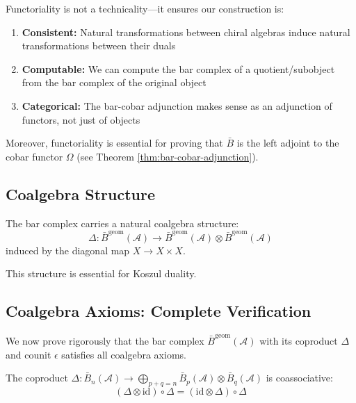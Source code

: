 \begin{remark}\label{rem:why-functoriality}
Functoriality is not a technicality—it ensures our construction is:
\begin{enumerate}
\item \textbf{Consistent:} Natural transformations between chiral algebras induce natural transformations between their duals
\item \textbf{Computable:} We can compute the bar complex of a quotient/subobject from the bar complex of the original object
\item \textbf{Categorical:} The bar-cobar adjunction makes sense as an adjunction of functors, not just of objects
\end{enumerate}

Moreover, functoriality is essential for proving that $\bar{B}$ is the left adjoint to the cobar functor $\Omega$ (see Theorem \ref{thm:bar-cobar-adjunction}).
\end{remark}

\subsection{Coalgebra Structure}

\begin{theorem}\label{thm:bar-coalgebra}
The bar complex carries a natural coalgebra structure:
$$\Delta: \bar{B}^{\text{geom}}(\mathcal{A}) \to \bar{B}^{\text{geom}}(\mathcal{A}) \otimes \bar{B}^{\text{geom}}(\mathcal{A})$$
induced by the diagonal map $X \to X \times X$.
\end{theorem}

This structure is essential for Koszul duality.

\subsection{Coalgebra Axioms: Complete Verification}
\label{subsec:coalgebra-axioms-complete}

We now prove rigorously that the bar complex $\bar{B}^{\text{geom}}(\mathcal{A})$ with its coproduct $\Delta$ and counit $\epsilon$ satisfies all coalgebra axioms.

\begin{theorem}[Coassociativity]\label{thm:coassociativity-complete}
The coproduct $\Delta: \bar{B}_n(\mathcal{A}) \to \bigoplus_{p+q=n} \bar{B}_p(\mathcal{A}) \otimes \bar{B}_q(\mathcal{A})$ is coassociative:
$$(\Delta \otimes \text{id}) \circ \Delta = (\text{id} \otimes \Delta) \circ \Delta$$
\end{theorem}

